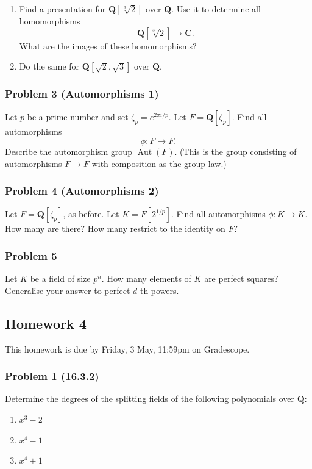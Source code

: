 \documentclass[11pt]{article}
\begin{document}
\begin{enumerate}
\item Find a presentation for \(\mathbf{Q}[\sqrt[3]{2}]\) over \(\mathbf{Q}\).
Use it to determine all homomorphisms
\[ \mathbf{Q}[\sqrt[3] 2] \to \mathbf{C}.\]
What are the images of these homomorphisms?

\item Do the same for \(\mathbf{Q}[\sqrt 2, \sqrt 3]\) over \(\mathbf{Q}\).
\end{enumerate}
\subsubsection{Problem 3 (Automorphisms 1)}
\label{sec:org824ac9d}

Let \(p\) be a prime number and set \(\zeta_p = e^{2\pi i / p}\).
Let \(F = \mathbf{Q}[\zeta_p]\).
Find all automorphisms
\[ \phi \colon F \to F.\]
Describe the automorphism group \(\operatorname{Aut}(F)\).
(This is the group consisting of automorphisms \(F \to F\) with composition as the group law.)
\subsubsection{Problem 4 (Automorphisms 2)}
\label{sec:org7c5bc3a}

Let \(F = \mathbf{Q}[\zeta_p]\), as before.
Let \(K = F[2^{1/p}]\).
Find all automorphisms \(\phi \colon K \to K\).
How many are there?
How many restrict to the identity on \(F\)?
\subsubsection{Problem 5}
\label{sec:org1fea222}

Let \(K\) be a field of size \(p^n\).
How many elements of \(K\) are perfect squares?
Generalise your answer to perfect \(d\)-th powers.
\subsection{Homework 4}
\label{sec:org30b237a}
This homework is due by Friday, 3 May, 11:59pm on Gradescope.
\subsubsection{Problem 1  (16.3.2)}
\label{sec:orgd5c39f8}

Determine the degrees of the splitting fields of the following polynomials over \(\mathbf{Q}\):
\begin{enumerate}
\item \(x^3-2\)
\item \(x^4-1\)
\item \(x^4+1\)
\end{enumerate}
\end{document}
